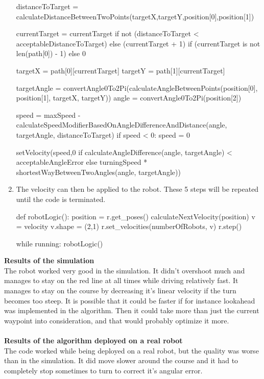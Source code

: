 \documentclass[10pt]{report}
\begin{document}
\begin{enumerate}
\begin{python}
    distanceToTarget = calculateDistanceBetweenTwoPoints(targetX,targetY,position[0],position[1])    
    
    currentTarget = currentTarget if not (distanceToTarget < acceptableDistanceToTarget) else (currentTarget + 1) if (currentTarget is not len(path[0]) - 1) else 0

    targetX = path[0][currentTarget]
    targetY = path[1][currentTarget]

    targetAngle = convertAngle0To2Pi(calculateAngleBetweenPoints(position[0], position[1], targetX, targetY))
    angle = convertAngle0To2Pi(position[2])

    speed = maxSpeed - calculateSpeedModifierBasedOnAngleDifferenceAndDistance(angle, targetAngle, distanceToTarget)
    if speed < 0: speed = 0
    
    setVelocity(speed,0 if calculateAngleDifference(angle, targetAngle) < acceptableAngleError else turningSpeed * shortestWayBetweenTwoAngles(angle, targetAngle))
    \end{python}
    \item The velocity can then be applied to the robot. These 5 steps will be repeated until the code is terminated. 
    \begin{python}
def robotLogic():
    position = r.get_poses()
    calculateNextVelocity(position)
    v = velocity
    v.shape = (2,1)
    r.set_velocities(numberOfRobots, v)
    r.step()

while running: robotLogic()
    \end{python}
\end{enumerate}
\textbf{Results of the simulation} \\
The robot worked very good in the simulation. It didn't overshoot much and manages to stay on the red line at all times while driving relatively fast. It manages to stay on the course by decreasing it's linear velocity if the turn becomes too steep. It is possible that it could be faster if for instance lookahead was implemented in the algorithm. Then it could take more than just the current waypoint into consideration, and that would probably optimize it more.
\\\\
\textbf{Results of the algorithm deployed on a real robot} \\
The code worked while being deployed on a real robot, but the quality was worse than in the simulation. It did move slower around the course and it had to completely stop sometimes to turn to correct it's angular error.
\end{document}
